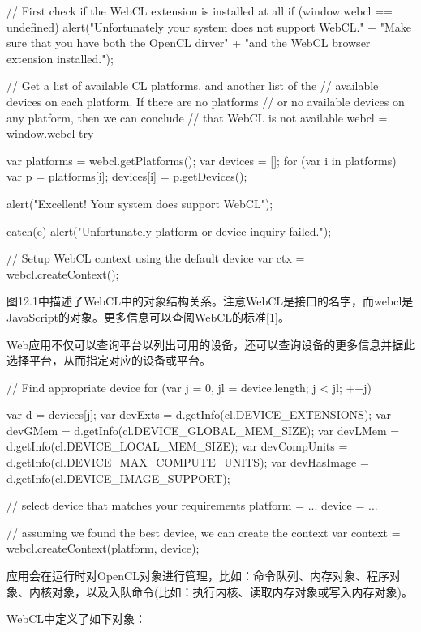 \begin{codebox}[javascript]
// First check if the WebCL extension is installed at all
if (window.webcl == undefined){
  alert("Unfortunately your system does not support WebCL." +
  "Make sure that you have both the OpenCL dirver" +
  "and the WebCL browser extension installed.");
}

// Get a list of available CL platforms, and another list of the
// available devices on each platform. If there are no platforms
// or no available devices on any platform, then we can conclude
// that WebCL is not available
webcl = window.webcl
try{
  var platforms = webcl.getPlatforms();
  var devices = [];
  for (var i in platforms){
    var p = platforms[i];
    devices[i] = p.getDevices();
  }

  alert("Excellent! Your system does support WebCL");
} catch(e){
  alert("Unfortunately platform or device inquiry failed.");
}

// Setup WebCL context using the default device
var ctx = webcl.createContext();
\end{codebox}


图12.1中描述了WebCL中的对象结构关系。注意WebCL是接口的名字，而webcl是JavaScript的对象。更多信息可以查阅WebCL的标准[1]。

Web应用不仅可以查询平台以列出可用的设备，还可以查询设备的更多信息并据此选择平台，从而指定对应的设备或平台。

\begin{codebox}[javascript]
// Find appropriate device
for (var j = 0, jl = device.length; j < jl; ++j){
  var d = devices[j];
  var devExts = d.getInfo(cl.DEVICE_EXTENSIONS);
  var devGMem = d.getInfo(cl.DEVICE_GLOBAL_MEM_SIZE);
  var devLMem = d.getInfo(cl.DEVICE_LOCAL_MEM_SIZE);
  var devCompUnits = d.getInfo(cl.DEVICE_MAX_COMPUTE_UNITS);
  var devHasImage = d.getInfo(cl.DEVICE_IMAGE_SUPPORT);

// select device that matches your requirements
  platform = ...
  device = ...
}

// assuming we found the best device, we can create the context
var context = webcl.createContext(platform, device);
\end{codebox}

应用会在运行时对OpenCL对象进行管理，比如：命令队列、内存对象、程序对象、内核对象，以及入队命令(比如：执行内核、读取内存对象或写入内存对象)。

WebCL中定义了如下对象：

